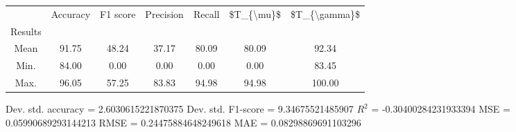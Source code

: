 \begin{tabular}{|c|c|c|c|c|c|c|}
\toprule
{} &  Accuracy &  F1 score &  Precision &  Recall &  \$T\_\{\textbackslash mu\}\$ &  \$T\_\{\textbackslash gamma\}\$ \\
Results &           &           &            &         &            &               \\
\hline
Mean    &     91.75 &     48.24 &      37.17 &   80.09 &      80.09 &         92.34 \\
Min.    &     84.00 &      0.00 &       0.00 &    0.00 &       0.00 &         83.45 \\
Max.    &     96.05 &     57.25 &      83.83 &   94.98 &      94.98 &        100.00 \\
\bottomrule
\end{tabular}

 Dev. std. accuracy = 2.6030615221870375
 Dev. std. F1-score = 9.34675521485907
 $R^2$ = -0.30400284231933394
 MSE = 0.05990689293144213
 RMSE = 0.24475884648249618
 MAE = 0.08298869691103296